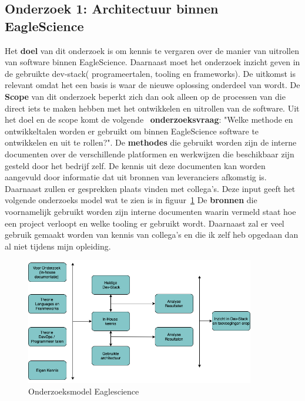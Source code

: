 \subsection{Onderzoek 1: Architectuur binnen EagleScience}\label{subsec:onderzoeksmethode-architectuur-binnen-eaglescience}
Het \textbf{doel} van dit onderzoek is om kennis te vergaren over de manier van uitrollen van software binnen EagleScience. Daarnaast moet het onderzoek inzicht geven in de gebruikte dev-stack( programeertalen, tooling en frameworks). De uitkomst is relevant omdat het een basis is waar de nieuwe oplossing onderdeel van wordt. De \textbf{Scope} van dit onderzoek beperkt zich dan ook alleen op de processen van die direct iets te maken hebben met het ontwikkelen en uitrollen van de software. Uit het doel en de scope komt de volgende ~\textbf{onderzoeksvraag}: "Welke methode en ontwikkeltalen worden er gebruikt om binnen EagleScience software te ontwikkelen en uit te rollen?". De \textbf{methodes} die gebruikt worden zijn de interne documenten over de verschillende platformen en werkwijzen die beschikbaar zijn gesteld door het bedrijf zelf. De kennis uit deze documenten kan worden aangevuld door informatie dat uit bronnen van leveranciers afkomstig is. Daarnaast zullen er gesprekken plaats vinden met collega's. Deze input geeft het volgende onderzoeks model wat te zien is in figuur~\ref{fig:OnderzoeksModelEaglescience}
De \textbf{bronnen} die voornamelijk gebruikt worden zijn interne documenten waarin vermeld staat hoe een project verloopt en welke tooling er gebruikt wordt. Daarnaast zal er veel gebruik gemaakt worden van kennis van collega's en die ik zelf heb opgedaan dan al niet tijdens mijn opleiding.
\begin{figure}[htbp]
    \myfloatalign
    \includegraphics[width=10cm]{gfx/OnderzoeksmodelES}
    \caption{Onderzoeksmodel Eaglescience}
    \label{fig:OnderzoeksModelEaglescience}
\end{figure}


\newpage %


